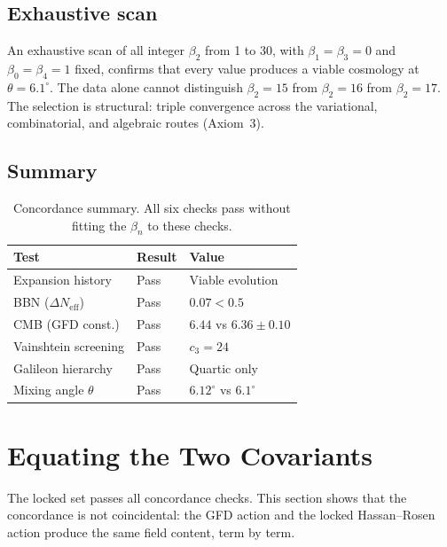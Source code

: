 \documentclass[twocolumn,showpacs,preprintnumbers,amsmath,amssymb,prd]{revtex4-2}
\begin{document}
\subsection{Exhaustive scan}

An exhaustive scan of all integer $\beta_2$ from 1 to 30, with $\beta_1 = \beta_3 = 0$ and $\beta_0 = \beta_4 = 1$ fixed, confirms that every value produces a viable cosmology at $\theta = 6.1^\circ$. The data alone cannot distinguish $\beta_2 = 15$ from $\beta_2 = 16$ from $\beta_2 = 17$. The selection is structural: triple convergence across the variational, combinatorial, and algebraic routes (Axiom~3).

\subsection{Summary}

\begin{table}[h]
\centering
\begin{tabular}{lll}
\toprule
\textbf{Test} & \textbf{Result} & \textbf{Value} \\
\midrule
Expansion history & Pass & Viable evolution \\
BBN ($\Delta N_\mathrm{eff}$) & Pass & $0.07 < 0.5$ \\
CMB (GFD const.) & Pass & $6.44$ vs $6.36 \pm 0.10$ \\
Vainshtein screening & Pass & $c_3 = 24$ \\
Galileon hierarchy & Pass & Quartic only \\
Mixing angle $\theta$ & Pass & $6.12^\circ$ vs $6.1^\circ$ \\
\bottomrule
\end{tabular}
\caption{Concordance summary. All six checks pass without fitting the $\beta_n$ to these checks.}
\label{tab:concordance}
\end{table}


\section{Equating the Two Covariants}
\label{sec:equating}

The locked set passes all concordance checks. This section shows that the concordance is not coincidental: the GFD action and the locked Hassan--Rosen action produce the same field content, term by term.
\end{document}
